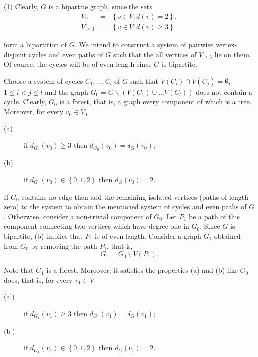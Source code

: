 \documentclass[fleqn,12pt,twoside]{article}
\newenvironment{proof}[1][Proof.]{\begin{trivlist}
\item[\hskip \labelsep {\bfseries #1}]}{\end{trivlist}}
\begin{document}
\begin{proof}
(1) Clearly, $G$ is a bipartite graph, since the sets\begin{eqnarray*}
V_{2} &=&\left\{ v\in V:d(v)=2\right\} , \\
V_{\geq 3} &=&\left\{ v\in V:d(v)\geq 3\right\}
\end{eqnarray*}

form a bipartition of $G$. We intend to construct a system of
pairwise
vertex-disjoint cycles and even paths of $G$ such that the all vertices of $V_{\geq 3}$ lie on them. Of course, the cycles will be of even length since $G$ is bipartite.

Choose a system of cycles $C_{1},...,C_{l}$ of $G$ such that
$V(C_{i})\cap V(C_{j})=\emptyset$, $1\leq i<j\leq l$ and the graph
$G_{0}=G\backslash (V(C_{1})\cup ...V(C_{l}))$ does not contain a
cycle. Clearly, $G_{0}$ is a forest, that is, a graph every
component of which is a tree. Moreover, for every $v_{0}\in V_{0}$

\begin{description}
\item[(a)] if $d_{G_{0}}(v_{0})\geq 3$ then $d_{G_{0}}(v_{0})=d_{G}(v_{0})$;

\item[(b)] if $d_{G_{0}}(v_{0})\in \left\{ 0,1,2\right\} $ then $d_{G}(v_{0})=2$.
\end{description}

If $G_{0}$ contains no edge then add the remaining isolated vertices
(paths of length zero) to the system to obtain the mentioned system
of cycles and even paths of $G$. Otherwise, consider a non-trivial
component of $G_{0}$. Let $P_{1}$ be a path of this component
connecting two vertices which have degree one in $G_{0}$. Since $G$
is bipartite, (b) implies that $P_{1}$ is of even length. Consider a
graph $G_{1}$ obtained from $G_{0}$ by removing
the path $P_{1}$, that is,\begin{equation*}
G_{1}=G_{0}\backslash V(P_{1}).
\end{equation*}

Note that $G_{1}$ is a forest. Moreover, it satisfies the properties
(a) and (b) like $G_{0}$ does, that is, for every $v_{1}\in V_{1}$

\begin{description}
\item[(a$^{\prime }$)] if $d_{G_{1}}(v_{1})\geq 3$ then $d_{G_{1}}(v_{1})=d_{G}(v_{1})$;

\item[(b$^{\prime }$)] if $d_{G_{1}}(v_{1})\in \left\{ 0,1,2\right\} $ then $d_{G}(v_{1})=2$.
\end{description}


\end{proof}
\end{document}
